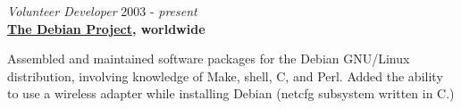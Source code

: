 \documentclass[overlapped,line,margin]{res}
\begin{document}
\begin{resume}
\textit{Volunteer Developer} \hfill 2003 - \textit{present} \\
\textbf{\href{https://www.debian.org}{The Debian Project}, worldwide}

  Assembled and maintained software packages for the Debian GNU/Linux
  distribution, involving knowledge of Make, shell, C, and Perl. Added
  the ability to use a wireless adapter while installing Debian (netcfg
  subsystem written in C.)

\end{resume}
\end{document}
